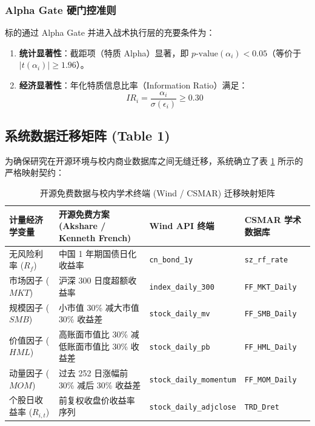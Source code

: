 \documentclass[11pt,a4paper]{article}
\begin{document}
\subsubsection{Alpha Gate 硬门控准则}
标的通过 Alpha Gate 并进入战术执行层的充要条件为：
\begin{enumerate}
    \item \textbf{统计显著性}：截距项（特质 Alpha）显著，即 $p\text{-value}(\alpha_i) < 0.05$（等价于 $|t(\alpha_i)| \ge 1.96$）。
    \item \textbf{经济显著性}：年化特质信息比率（Information Ratio）满足：
    \begin{equation}
    IR_i = \frac{\alpha_i}{\sigma(\epsilon_i)} \ge 0.30
    \end{equation}
\end{enumerate}

\subsection{系统数据迁移矩阵 (Table 1)}
为确保研究在开源环境与校内商业数据库之间无缝迁移，系统确立了表 \ref{tab:mapping} 所示的严格映射契约：

\begin{table}[htbp]
\centering
\small
\caption{开源免费数据与校内学术终端 (Wind / CSMAR) 迁移映射矩阵}
\label{tab:mapping}
\begin{tabularx}{\textwidth}{lXXX}
\toprule
\textbf{计量经济学变量} & \textbf{开源免费方案 (Akshare / Kenneth French)} & \textbf{Wind API 终端} & \textbf{CSMAR 学术数据库} \\
\midrule
无风险利率 ($R_f$) & 中国 1 年期国债日化收益率 & \texttt{cn\_bond\_1y} & \texttt{sz\_rf\_rate} \\
市场因子 ($MKT$) & 沪深 300 日度超额收益率 & \texttt{index\_daily\_300} & \texttt{FF\_MKT\_Daily} \\
规模因子 ($SMB$) & 小市值 30\% 减大市值 30\% 收益差 & \texttt{stock\_daily\_mv} & \texttt{FF\_SMB\_Daily} \\
价值因子 ($HML$) & 高账面市值比 30\% 减低账面市值比 30\% 收益差 & \texttt{stock\_daily\_pb} & \texttt{FF\_HML\_Daily} \\
动量因子 ($MOM$) & 过去 252 日涨幅前 30\% 减后 30\% 收益差 & \texttt{stock\_daily\_momentum} & \texttt{FF\_MOM\_Daily} \\
个股日收益率 ($R_{i,t}$) & 前复权收盘价收益率序列 & \texttt{stock\_daily\_adjclose} & \texttt{TRD\_Dret} \\
\bottomrule
\end{tabularx}
\end{table}
\end{document}
